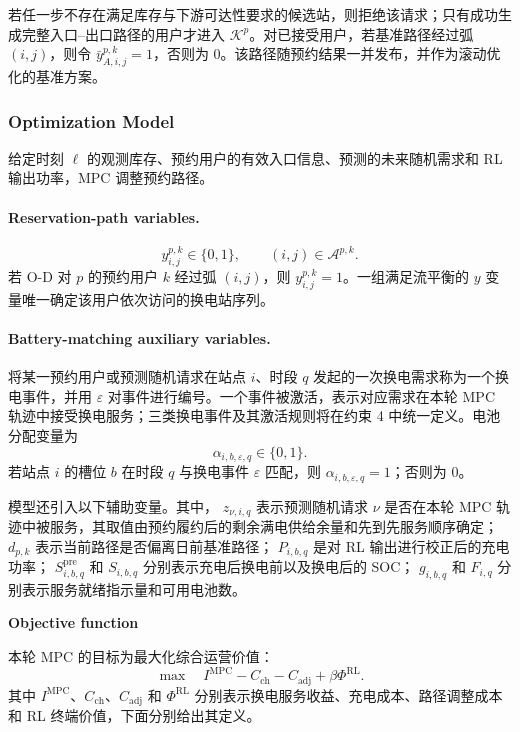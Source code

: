 \documentclass[12pt,a4paper,UTF8]{ctexart}
\begin{document}
若任一步不存在满足库存与下游可达性要求的候选站，则拒绝该请求；只有成功生成完整入口--出口路径的用户才进入 $\mathcal K^p$。对已接受用户，若基准路径经过弧 $(i,j)$，则令 $\bar y_{A,i,j}^{p,k}=1$，否则为 $0$。该路径随预约结果一并发布，并作为滚动优化的基准方案。


\subsubsection{Optimization Model}

给定时刻 $\ell$ 的观测库存、预约用户的有效入口信息、预测的未来随机需求和 RL 输出功率，MPC 调整预约路径。

\paragraph{Reservation-path variables.}
\[
y_{i,j}^{p,k}\in\{0,1\},
\qquad
(i,j)\in\mathcal A^{p,k}.
\]
若 O-D 对 $p$ 的预约用户 $k$ 经过弧 $(i,j)$，则
$y_{i,j}^{p,k}=1$。一组满足流平衡的 $y$ 变量唯一确定该用户依次访问的换电站序列。

\paragraph{Battery-matching auxiliary variables.}
将某一预约用户或预测随机请求在站点 $i$、时段 $q$ 发起的一次换电需求称为一个换电事件，并用 $\varepsilon$ 对事件进行编号。一个事件被激活，表示对应需求在本轮 MPC 轨迹中接受换电服务；三类换电事件及其激活规则将在约束 4 中统一定义。电池分配变量为
\[
\alpha_{i,b,\varepsilon,q}\in\{0,1\}.
\]
若站点 $i$ 的槽位 $b$ 在时段 $q$ 与换电事件 $\varepsilon$ 匹配，则
$\alpha_{i,b,\varepsilon,q}=1$；否则为 $0$。

模型还引入以下辅助变量。其中，
$z_{\nu,i,q}$ 表示预测随机请求 $\nu$ 是否在本轮 MPC 轨迹中被服务，其取值由预约履约后的剩余满电供给余量和先到先服务顺序确定；
$d_{p,k}$ 表示当前路径是否偏离日前基准路径；
$P_{i,b,q}$ 是对 RL 输出进行校正后的充电功率；
$S_{i,b,q}^{\mathrm{pre}}$ 和 $S_{i,b,q}$ 分别表示充电后换电前以及换电后的 SOC；
$g_{i,b,q}$ 和 $F_{i,q}$ 分别表示服务就绪指示量和可用电池数。

\textbf{Objective function}

本轮 MPC 的目标为最大化综合运营价值：
\begin{equation}
\max\quad
I^{\mathrm{MPC}}-C_{\mathrm{ch}}-C_{\mathrm{adj}}
+\beta\Phi^{\mathrm{RL}}.
\label{eq:objective}
\end{equation}
其中 $I^{\mathrm{MPC}}$、$C_{\mathrm{ch}}$、$C_{\mathrm{adj}}$ 和 $\Phi^{\mathrm{RL}}$ 分别表示换电服务收益、充电成本、路径调整成本和 RL 终端价值，下面分别给出其定义。
\end{document}
